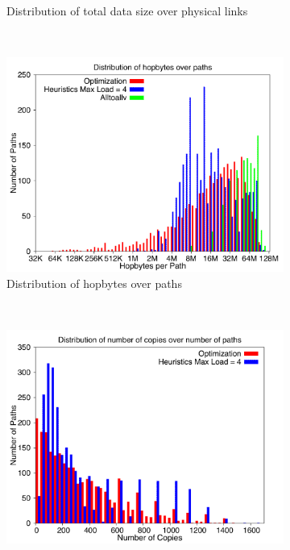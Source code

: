 \begin{figure}[!htbp]
\begin{subfigure}[b]{0.49\textwidth}
                \caption{Distribution of total data size over physical links}
                \label{fig:87_2048_loaddata}
        \end{subfigure}
        ~ %
        \begin{subfigure}[b]{0.49\textwidth}
                \includegraphics[width=\textwidth]{report_figures/constantr/87_2048/hopbyte_histo.pdf}
                \caption{Distribution of hopbytes over paths}
                \label{fig:87_2048_hopbyte}
        \end{subfigure}
        ~ %
        \begin{subfigure}[b]{0.49\textwidth}
                \includegraphics[width=\textwidth]{report_figures/constantr/87_2048/hopcopy_histo.pdf}

\end{subfigure}
\end{figure}
